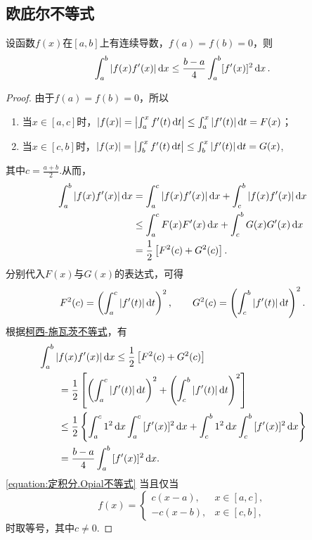 \subsection{欧庇尔不等式}
\begin{theorem}[欧庇尔不等式]\label{theorem:定积分.欧庇尔不等式}
设函数\(f(x)\)在\([a,b]\)上有连续导数，\(f(a)=f(b)=0\)，则\begin{equation}\label{equation:定积分.Opial不等式}
\int_a^b \abs{f(x) f'(x)} \dd{x}
\leq \frac{b-a}{4}
\int_a^b [f'(x)]^2 \dd{x}.
\end{equation}
\begin{proof}
由于\(f(a)=f(b)=0\)，所以\begin{enumerate}
\item 当\(x \in \left[a,c\right]\)时，\(\abs{f(x)} = \abs{\int_a^x f'(t) \dd{t}} \leq \int_a^x \abs{f'(t)} \dd{t} = F(x)\)；
\item 当\(x \in \left[c,b\right]\)时，\(\abs{f(x)} = \abs{\int_b^x f'(t) \dd{t}} \leq \int_b^x \abs{f'(t)} \dd{t} = G(x)\),
\end{enumerate}其中\(c=\frac{a+b}{2}\).从而，\begin{align*}
\int_a^b \abs{f(x) f'(x)} \dd{x}
&= \int_a^c \abs{f(x) f'(x)} \dd{x}
    + \int_c^b \abs{f(x) f'(x)} \dd{x} \\
&\leq \int_a^c F(x) F'(x) \dd{x}
    + \int_c^b G(x) G'(x) \dd{x} \\
&= \frac{1}{2} \left[ F^2(c) + G^2(c) \right].
\end{align*}分别代入\(F(x)\)与\(G(x)\)的表达式，可得\[
F^2(c) = \left( \int_a^c \abs{f'(t)} \dd{t} \right)^2,
\qquad
G^2(c) = \left( \int_c^b \abs{f'(t)} \dd{t} \right)^2.
\]根据\hyperref[equation:定积分.柯西-施瓦茨不等式]{柯西-施瓦茨不等式}，有\begin{align*}
&\hspace{-20pt}\int_a^b{\abs{f(x) f'(x)} \dd{x}}
\leq \frac{1}{2} \left[
    F^2(c)
    + G^2(c)
    \right] \\
&= \frac{1}{2} \left[
    \left(\int_a^c{\abs{f'(t)}\dd{t}}\right)^2
    +\left(\int_c^b{\abs{f'(t)}\dd{t}}\right)^2
    \right] \\
&\leq \frac{1}{2} \left\{
    \int_a^c{1^2 \dd{x}}
    \int_a^c{[f'(x)]^2 \dd{x}}
    +\int_c^b{1^2 \dd{x}}
    \int_c^b{[f'(x)]^2 \dd{x}}
    \right\} \\
&= \frac{b-a}{4} \int_a^b{[f'(x)]^2 \dd{x}}.
\end{align*}
\cref{equation:定积分.Opial不等式} 当且仅当\[
f(x) = \left\{ \begin{array}{cl}
c(x-a), & x\in\left[a,c\right], \\
-c(x-b), & x\in\left[c,b\right],
\end{array} \right.
\]时取等号，其中\(c\neq0\).
\end{proof}
\end{theorem}

